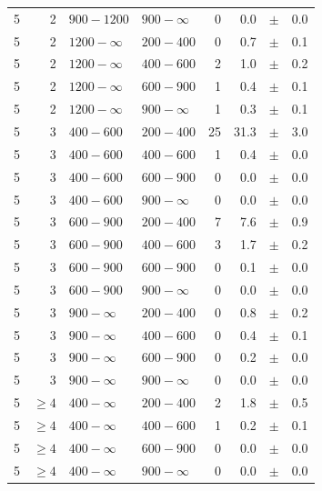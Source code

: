 \begin{table}[!h]
\begin{tabular}{rrllrrcl}
5 & 2 & $ 900-1200$ & $900-\infty$ &      0 &      0.0 &$\pm$&    0.0 \\
5 & 2 & $1200- \infty$ & $200-400$ &      0 &      0.7 &$\pm$&    0.1 \\
5 & 2 & $1200- \infty$ & $400-600$ &      2 &      1.0 &$\pm$&    0.2 \\
5 & 2 & $1200- \infty$ & $600-900$ &      1 &      0.4 &$\pm$&    0.1 \\
5 & 2 & $1200- \infty$ & $900-\infty$ &      1 &      0.3 &$\pm$&    0.1 \\
5 & 3 & $ 400- 600$ & $200-400$ &     25 &     31.3 &$\pm$&    3.0 \\
5 & 3 & $ 400- 600$ & $400-600$ &      1 &      0.4 &$\pm$&    0.0 \\
5 & 3 & $ 400- 600$ & $600-900$ &      0 &      0.0 &$\pm$&    0.0 \\
5 & 3 & $ 400- 600$ & $900-\infty$ &      0 &      0.0 &$\pm$&    0.0 \\
5 & 3 & $ 600- 900$ & $200-400$ &      7 &      7.6 &$\pm$&    0.9 \\
5 & 3 & $ 600- 900$ & $400-600$ &      3 &      1.7 &$\pm$&    0.2 \\
5 & 3 & $ 600- 900$ & $600-900$ &      0 &      0.1 &$\pm$&    0.0 \\
5 & 3 & $ 600- 900$ & $900-\infty$ &      0 &      0.0 &$\pm$&    0.0 \\
5 & 3 & $ 900- \infty$ & $200-400$ &      0 &      0.8 &$\pm$&    0.2 \\
5 & 3 & $ 900- \infty$ & $400-600$ &      0 &      0.4 &$\pm$&    0.1 \\
5 & 3 & $ 900- \infty$ & $600-900$ &      0 &      0.2 &$\pm$&    0.0 \\
5 & 3 & $ 900- \infty$ & $900-\infty$ &      0 &      0.0 &$\pm$&    0.0 \\
5 & $\geq 4$ & $ 400- \infty$ & $200-400$ &      2 &      1.8 &$\pm$&    0.5 \\
5 & $\geq 4$ & $ 400- \infty$ & $400-600$ &      1 &      0.2 &$\pm$&    0.1 \\
5 & $\geq 4$ & $ 400- \infty$ & $600-900$ &      0 &      0.0 &$\pm$&    0.0 \\
5 & $\geq 4$ & $ 400- \infty$ & $900-\infty$ &      0 &      0.0 &$\pm$&    0.0 \\
    \hline
  \end{tabular}
\end{table}

